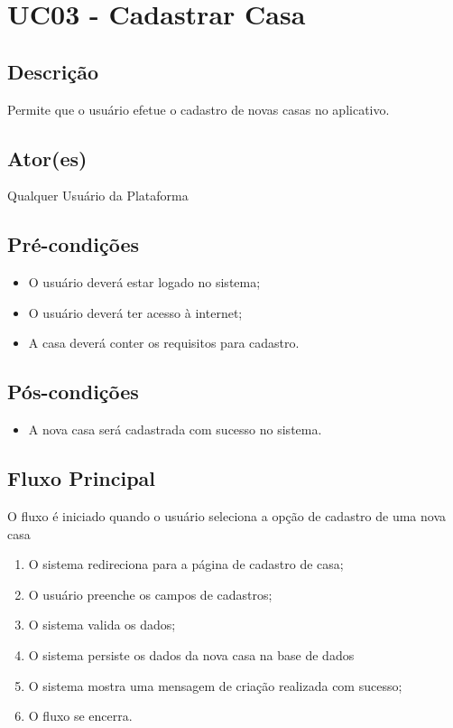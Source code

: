 \section{UC03 \-- Cadastrar Casa}
    \subsection{Descrição}
        Permite que o usuário efetue o cadastro de novas casas no aplicativo.
    \subsection{Ator(es)}
        Qualquer Usuário da Plataforma
    \subsection{Pré-condições}
        \begin{itemize}
            \item O usuário deverá estar logado no sistema;
            \item O usuário deverá ter acesso à internet;
            \item A casa deverá conter os requisitos para cadastro.
        \end{itemize}
    \subsection{Pós-condições}
        \begin{itemize}
            \item A nova casa será cadastrada com sucesso no sistema.
        \end{itemize}
    \subsection{Fluxo Principal}
        O fluxo é iniciado quando o usuário seleciona a opção de cadastro de uma nova casa
        \begin{enumerate}
            \item O sistema redireciona para a página de cadastro de casa;
            \item O usuário preenche os campos de cadastros;
            \item O sistema valida os dados;
            \item O sistema persiste os dados da nova casa na base de dados
            \item O sistema mostra uma mensagem de criação realizada com sucesso;
            \item O fluxo se encerra.
        \end{enumerate}
